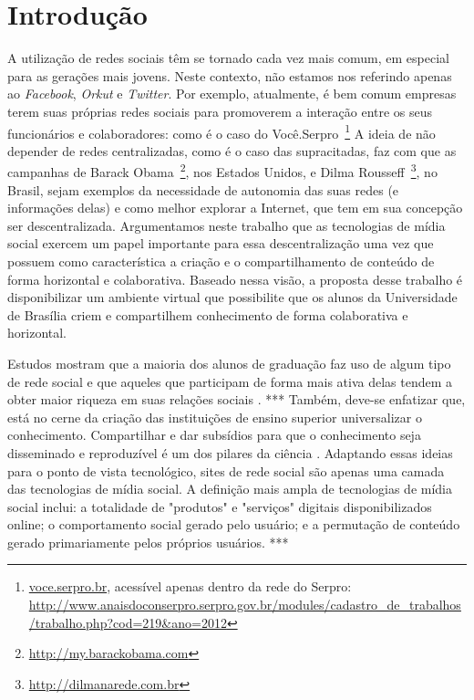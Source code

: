 \chapter{Introdução}
 
A utilização de redes sociais têm se tornado cada vez mais comum, em especial
para as gerações mais jovens. Neste contexto, não estamos nos
referindo apenas ao \textit{Facebook}, \textit{Orkut} e \textit{Twitter}. 
%
Por exemplo, atualmente, é bem comum empresas terem suas próprias redes sociais para
promoverem a interação entre os seus funcionários e colaboradores: como é o caso do
Você.Serpro~\footnote{\url{voce.serpro.br}, acessível apenas dentro da rede do Serpro:
\url{http://www.anaisdoconserpro.serpro.gov.br/modules/cadastro_de_trabalhos/trabalho.php?cod=219&ano=2012}}
%
A ideia de não depender de redes centralizadas, como é o caso das supracitadas, faz com que
as campanhas de Barack Obama~\footnote{\url{http://my.barackobama.com}}, nos
Estados Unidos, e Dilma Rousseff~\footnote{\url{http://dilmanarede.com.br}}, no
Brasil, sejam exemplos da necessidade de autonomia das suas redes
(e informações delas) e como melhor explorar a Internet, que tem em sua
concepção ser descentralizada. 
Argumentamos neste trabalho que as tecnologias de mídia social exercem um papel importante para 
essa descentralização uma vez que possuem como característica a criação e o
compartilhamento de conteúdo de forma horizontal e colaborativa. 
%
Baseado nessa visão, a proposta desse trabalho é disponibilizar um ambiente
virtual que possibilite que os alunos da Universidade de Brasília criem e
compartilhem conhecimento de forma colaborativa e horizontal.
 
Estudos mostram que a maioria dos alunos de graduação faz uso de algum
tipo de rede social e que aqueles que participam de forma mais ativa delas
tendem a obter maior riqueza em suas relações sociais \cite{???}.  ***
%
Também, deve-se enfatizar que, está no cerne da criação das instituições de
ensino superior universalizar o conhecimento. Compartilhar e dar subsídios para
que o conhecimento seja disseminado e reproduzível é um dos pilares da ciência
\cite{kon2011}.
%
%
Adaptando essas ideias para o ponto de vista tecnológico, sites de rede social
são apenas uma camada das tecnologias de mídia social. A definição mais ampla de
tecnologias de mídia social inclui: a totalidade de "produtos" e "serviços"
digitais disponibilizados online; o comportamento social gerado pelo usuário; e
a permutação de conteúdo gerado primariamente pelos próprios usuários.
\cite{???} ***
 

